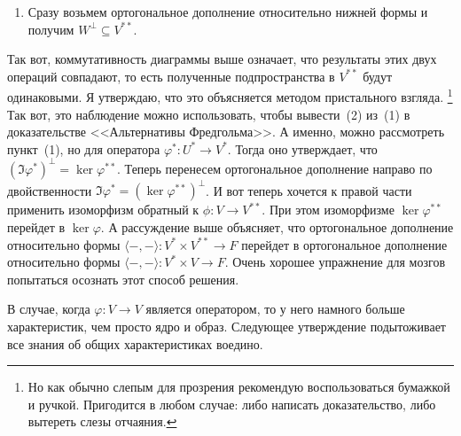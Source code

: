 \begin{itemize}
\begin{enumerate}
\item Сразу возьмем ортогональное дополнение относительно нижней формы и получим $W^\bot \subseteq V^{**}$.
\end{enumerate}
Так вот, коммутативность диаграммы выше означает, что результаты этих двух операций совпадают, то есть полученные подпространства в $V^{**}$ будут одинаковыми.
Я утверждаю, что это объясняется методом пристального взгляда.%
\footnote{Но как обычно слепым для прозрения рекомендую воспользоваться бумажкой и ручкой.
Пригодится в любом случае: либо написать доказательство, либо вытереть слезы отчаяния.}
Так вот, это наблюдение можно использовать, чтобы вывести~(2) из~(1) в доказательстве <<Альтернативы Фредгольма>>.
А именно, можно рассмотреть пункт~(1), но для оператора $\varphi^*\colon U^*\to V^*$.
Тогда оно утверждает, что $(\Im \varphi^*)^\bot = \ker \varphi^{**}$.
Теперь перенесем ортогональное дополнение направо по двойственности  $\Im \varphi^* = (\ker \varphi^{**})^\bot$.
И вот теперь хочется к правой части применить изоморфизм обратный к $\phi\colon V\to V^{**}$.
При этом изоморфизме $\ker \varphi^{**}$ перейдет в $\ker \varphi$.
А рассуждение выше объясняет, что ортогональное дополнение относительно формы $\langle{-},{-}\rangle\colon V^{*}\times V^{**}\to F$ перейдет в ортогональное дополнение относительно формы $\langle {-},{-}\rangle \colon V^* \times V\to F$.
Очень хорошее упражнение для мозгов попытаться осознать этот способ решения.
\end{itemize}

В случае, когда $\varphi\colon V\to V$ является оператором, то у него намного больше характеристик, чем просто ядро и образ.
Следующее утверждение подытоживает все знания об общих характеристиках воедино.

